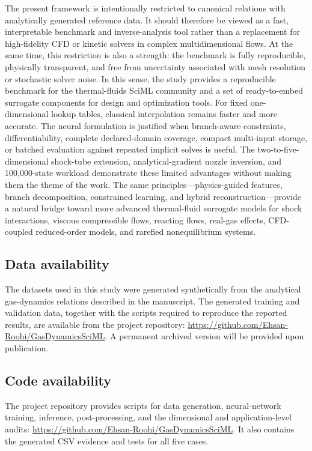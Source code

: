 \documentclass[preprint,12pt]{elsarticle}
\newcommand{\rev}[1]{#1}
\newcommand{\rev}[1]{\textcolor{revisionblue}{#1}}
\begin{document}
The present framework is intentionally restricted to canonical relations with analytically generated reference data. It should therefore be viewed as a fast, interpretable benchmark and inverse-analysis tool rather than a replacement for high-fidelity CFD or kinetic solvers in complex multidimensional flows. At the same time, this restriction is also a strength: the benchmark is fully reproducible, physically transparent, and free from uncertainty associated with mesh resolution or stochastic solver noise. In this sense, the study provides a reproducible benchmark for the thermal-fluids SciML community and a set of ready-to-embed surrogate components for design and optimization tools. \rev{For fixed one-dimensional lookup tables, classical interpolation remains faster and more accurate. The neural formulation is justified when branch-aware constraints, differentiability, complete declared-domain coverage, compact multi-input storage, or batched evaluation against repeated implicit solves is useful. The two-to-five-dimensional shock-tube extension, analytical-gradient nozzle inversion, and 100,000-state workload demonstrate these limited advantages without making them the theme of the work.} The same principles---physics-guided features, branch decomposition, constrained learning, and hybrid reconstruction---provide a natural bridge toward more advanced thermal-fluid surrogate models for shock interactions, viscous compressible flows, reacting flows, real-gas effects, CFD-coupled reduced-order models, and rarefied nonequilibrium systems.

\subsection*{Data availability}

The datasets used in this study were generated synthetically from the analytical gas-dynamics relations described in the manuscript. The generated training and validation data, together with the scripts required to reproduce the reported results, are available from the project repository: \url{https://github.com/Ehsan-Roohi/GasDynamicsSciML}. A permanent archived version will be provided upon publication.

\subsection*{Code availability}

The project repository provides scripts for data generation, neural-network training, inference, post-processing, and the dimensional and application-level audits: \url{https://github.com/Ehsan-Roohi/GasDynamicsSciML}. It also contains the generated CSV evidence and tests for all five cases.
\end{document}
